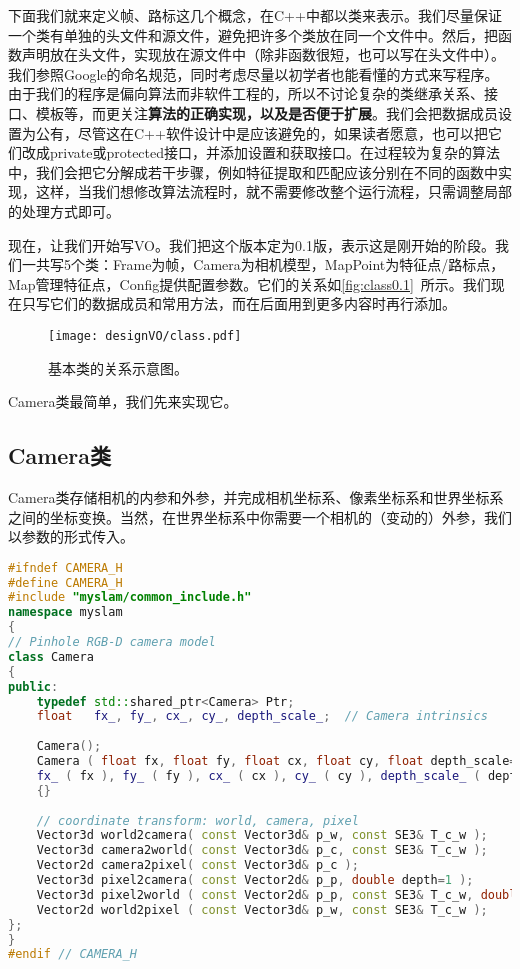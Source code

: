下面我们就来定义帧、路标这几个概念，在C++中都以类来表示。我们尽量保证一个类有单独的头文件和源文件，避免把许多个类放在同一个文件中。然后，把函数声明放在头文件，实现放在源文件中（除非函数很短，也可以写在头文件中）。我们参照Google的命名规范，同时考虑尽量以初学者也能看懂的方式来写程序。由于我们的程序是偏向算法而非软件工程的，所以不讨论复杂的类继承关系、接口、模板等，而更关注\textbf{算法的正确实现，以及是否便于扩展}。我们会把数据成员设置为公有，尽管这在C++软件设计中是应该避免的，如果读者愿意，也可以把它们改成private或protected接口，并添加设置和获取接口。在过程较为复杂的算法中，我们会把它分解成若干步骤，例如特征提取和匹配应该分别在不同的函数中实现，这样，当我们想修改算法流程时，就不需要修改整个运行流程，只需调整局部的处理方式即可。

现在，让我们开始写VO。我们把这个版本定为0.1版，表示这是刚开始的阶段。我们一共写5个类：Frame为帧，Camera为相机模型，MapPoint为特征点/路标点，Map管理特征点，Config提供配置参数。它们的关系如\autoref{fig:class0.1}~所示。我们现在只写它们的数据成员和常用方法，而在后面用到更多内容时再行添加。

\begin{figure}[!ht]
	\centering
	\texttt{[image: designVO/class.pdf]}
	\caption{基本类的关系示意图。}
	\label{fig:class0.1}
\end{figure}

Camera类最简单，我们先来实现它。
\clearpage

\subsection{Camera类}
Camera类存储相机的内参和外参，并完成相机坐标系、像素坐标系和世界坐标系之间的坐标变换。当然，在世界坐标系中你需要一个相机的（变动的）外参，我们以参数的形式传入。

\begin{lstlisting}[language=c++,caption=slambook/project/0.1/include/myslam/camera.h]
#ifndef CAMERA_H
#define CAMERA_H
#include "myslam/common_include.h"
namespace myslam
{
// Pinhole RGB-D camera model
class Camera
{
public:
	typedef std::shared_ptr<Camera> Ptr;
	float   fx_, fy_, cx_, cy_, depth_scale_;  // Camera intrinsics 
	
	Camera();
	Camera ( float fx, float fy, float cx, float cy, float depth_scale=0 ) :
	fx_ ( fx ), fy_ ( fy ), cx_ ( cx ), cy_ ( cy ), depth_scale_ ( depth_scale )
	{}
	
	// coordinate transform: world, camera, pixel
	Vector3d world2camera( const Vector3d& p_w, const SE3& T_c_w );
	Vector3d camera2world( const Vector3d& p_c, const SE3& T_c_w );
	Vector2d camera2pixel( const Vector3d& p_c );
	Vector3d pixel2camera( const Vector2d& p_p, double depth=1 ); 
	Vector3d pixel2world ( const Vector2d& p_p, const SE3& T_c_w, double depth=1 );
	Vector2d world2pixel ( const Vector3d& p_w, const SE3& T_c_w );
};
}
#endif // CAMERA_H
\end{lstlisting}

